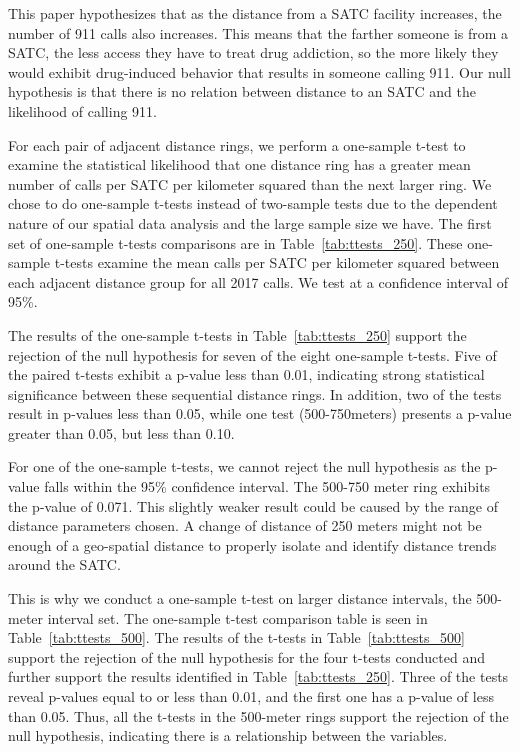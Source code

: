 \documentclass[12pt]{article}
\begin{document}
This paper hypothesizes that as the distance from a SATC facility increases, the number of 911 calls also increases. This means that the farther someone is from a SATC, the less access they have to treat drug addiction, so the more likely they would exhibit drug-induced behavior that results in someone calling 911. Our null hypothesis is that there is no relation between distance to an SATC and the likelihood of calling 911.
 
For each pair of adjacent distance rings, we perform a one-sample t-test to examine the statistical likelihood that one distance ring has a greater mean number of calls per SATC per kilometer squared than the next larger ring. We chose to do one-sample t-tests instead of two-sample tests due to the dependent nature of our spatial data analysis and the large sample size we have. The first set of one-sample t-tests comparisons are in Table~\ref{tab:ttests_250}. These one-sample t-tests examine the mean calls per SATC per kilometer squared between each adjacent distance group for all 2017 calls. We test at a confidence interval of 95\%.

The results of the one-sample t-tests in Table~\ref{tab:ttests_250} support the rejection of the null hypothesis for seven of the eight one-sample t-tests. Five of the paired t-tests exhibit a p-value less than 0.01, indicating strong statistical significance between these sequential distance rings. In addition, two of the tests result in p-values less than 0.05, while one test (500-750meters) presents a p-value greater than 0.05, but less than 0.10. 


\label{tabl:Table4}

For one of the one-sample t-tests, we cannot reject the null hypothesis as the p-value falls within the 95\% confidence interval. The 500-750 meter ring exhibits the p-value of 0.071. This slightly weaker result could be caused by the range of distance parameters chosen. A change of distance of 250 meters might not be enough of a geo-spatial distance to properly isolate and identify distance trends around the SATC. 

This is why we conduct a one-sample t-test on larger distance intervals, the 500-meter interval set. The one-sample t-test comparison table is seen in Table~\ref{tab:ttests_500}. The results of the t-tests in Table~\ref{tab:ttests_500} support the rejection of the null hypothesis for the four t-tests conducted and further support the results identified in Table~\ref{tab:ttests_250}. Three of the tests reveal p-values equal to or less than 0.01, and the first one has a p-value of less than 0.05. Thus, all the t-tests in the 500-meter rings support the rejection of the null hypothesis, indicating there is a relationship between the variables. 
\end{document}
